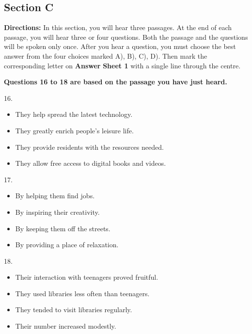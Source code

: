 \documentclass[UTF8,11pt]{ctexart}
\begin{document}
\subsection*{\textbf{Section C}}


\textbf{Directions:} In this section, you will hear three passages. At the end of each passage, you will hear three or four questions. Both the passage and the questions will be spoken only once. After you hear a question, you must choose the best answer from the four choices marked A), B), C), D). Then mark the corresponding letter on\textbf{ Answer} \textbf{Sheet 1} with a single line through the centre.


\textbf{Questions 16 to 18 are based on the passage you have just heard.}


16.


\begin{itemize}[leftmargin=2em,itemsep=.2em,topsep=.4em]\item[A.] They help spread the latest technology.
\item[B.] They greatly enrich people’s leisure life.
\item[C.] They provide residents with the resources needed.
\item[D.] They allow free access to digital books and videos.
\end{itemize}

17.


\begin{itemize}[leftmargin=2em,itemsep=.2em,topsep=.4em]\item[A.] By helping them find jobs.
\item[B.] By inspiring their creativity.
\item[C.] By keeping them off the streets.
\item[D.] By providing a place of relaxation.
\end{itemize}

18.


\begin{itemize}[leftmargin=2em,itemsep=.2em,topsep=.4em]\item[A.] Their interaction with teenagers proved fruitful.
\item[B.] They used libraries less often than teenagers.
\item[C.] They tended to visit libraries regularly.
\end{itemize}

\begin{itemize}[leftmargin=2em,itemsep=.2em,topsep=.4em]\item[D.] Their number increased modestly.
\end{itemize}
\end{document}
